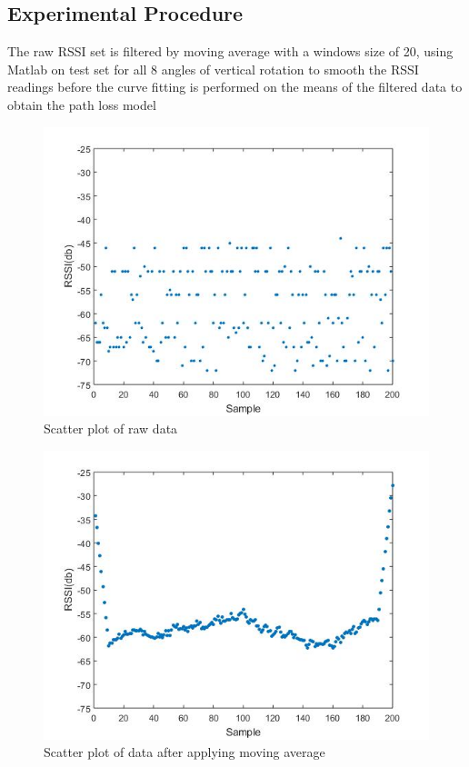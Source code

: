 \subsection*{Experimental Procedure}
The raw RSSI set is filtered by moving average with a windows size of 20, using Matlab on test set for all 8 angles of vertical rotation to smooth the RSSI readings before the curve fitting is performed on the means of the filtered data to obtain the
path loss model

\begin{figure}[H]
\centering
\includegraphics[width=\textwidth]{Image/scatterRaw.jpg}
\caption{Scatter plot of raw data}
\label{}
\end{figure}


\begin{figure}[H]
\centering
\includegraphics[width=\textwidth]{Image/s05Avg.jpg}
\caption{Scatter plot of data after applying moving average}
\label{}
\end{figure}



